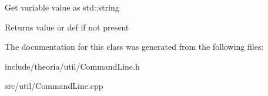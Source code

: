 Get variable value as std\+::string \begin{DoxyReturn}{Returns}
value or def if not present 
\end{DoxyReturn}


The documentation for this class was generated from the following files\+:\begin{DoxyCompactItemize}
\item 
include/theoria/util/Command\+Line.\+h\item 
src/util/Command\+Line.\+cpp\end{DoxyCompactItemize}
